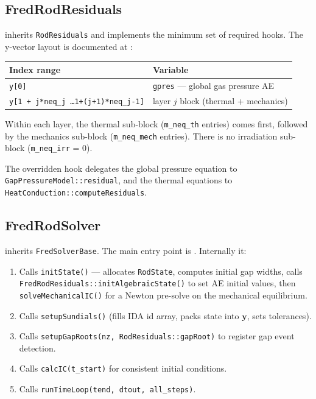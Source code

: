 \documentclass[11pt,a4paper]{article}
\begin{document}
\subsection{FredRodResiduals}
\label{sec:rod_res}

 inherits \texttt{RodResiduals} and implements the minimum set of required hooks.  The y-vector layout is documented at :

\begin{center}
\begin{tabular}{ll}
  \toprule
  Index range & Variable \\
  \midrule
  \texttt{y[0]} & \texttt{gpres} — global gas pressure AE \\
  \texttt{y[1 + j*neq\_j \ldots 1+(j+1)*neq\_j-1]} & layer $j$ block (thermal + mechanics) \\
  \bottomrule
\end{tabular}
\end{center}

Within each layer, the thermal sub-block (\texttt{m\_neq\_th} entries) comes first, followed by the mechanics sub-block (\texttt{m\_neq\_mech} entries). There is no irradiation sub-block (\texttt{m\_neq\_irr} = 0).

The overridden hook  delegates the global pressure equation to \texttt{GapPressureModel::residual}, and the thermal equations to \texttt{HeatConduction::computeResiduals}.

\subsection{FredRodSolver}
\label{sec:rod_solver}

 inherits \texttt{FredSolverBase}.  The main entry point is .  Internally it:

\begin{enumerate}
  \item Calls \texttt{initState()} — allocates \texttt{RodState}, computes initial gap widths, calls \texttt{FredRodResiduals::initAlgebraicState()} to set AE initial values, then \texttt{solveMechanicalIC()} for a Newton pre-solve on the mechanical equilibrium.
  \item Calls \texttt{setupSundials()} (fills IDA id array, packs state into $\mathbf{y}$, sets tolerances).
  \item Calls \texttt{setupGapRoots(nz, RodResiduals::gapRoot)} to register gap event detection.
  \item Calls \texttt{calcIC(t\_start)} for consistent initial conditions.
  \item Calls \texttt{runTimeLoop(tend, dtout, all\_steps)}.
\end{enumerate}
\end{document}
